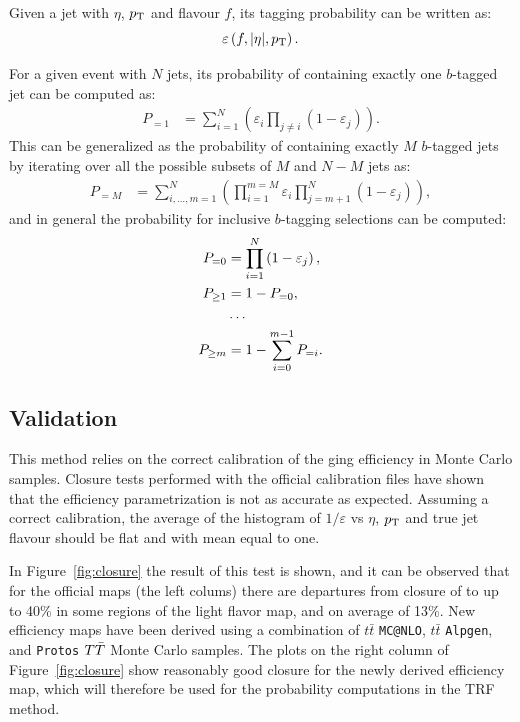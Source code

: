 Given a jet with $\eta$, $\pt$ and flavour $f$, its 
tagging probability can be written as:
\begin{equation}
	\varepsilon \left(f,|\eta|,\pt\right).
\end{equation}

For a given event with $N$ jets, its probability of 
containing exactly one $b$-tagged jet can be computed as:
\begin{align}
	P_{=1} &= \sum\limits_{i=1}^N \left( \varepsilon_{i} \prod\limits_{j \neq i} \left( 1 - \varepsilon_{j} \right) \right).\end{align}
This can be generalized as the probability of containing exactly $M$
$b$-tagged jets by iterating over all the possible subsets of $M$ and $N-M$
jets as:
\begin{align}
        P_{=M} &= \sum\limits_{i,\dots,m=1}^N 
        \left( 
        \prod\limits_{i=1}^{m=M} \varepsilon_{i}  
        \prod\limits_{j=m+1}^N \left( 1 - \varepsilon_{j} \right) 
        \right),
\end{align}
and in general the probability for inclusive $b$-tagging selections can be
computed:
\begin{align}
	P_{=0} &= \prod\limits_{i=1}^N \left( 1 - \varepsilon_{j} \right), \\
	P_{\geq 1} &= 1 - P_{=0},\\
&\dots \notag\\
	P_{\geq m} &= 1 - \sum\limits_{i=0}^{m-1} P_{=i}.
\end{align}

\subsection{Validation}
This method relies on the correct calibration of the \btag ging efficiency in 
Monte Carlo samples. 
Closure tests performed with the official calibration files have shown that 
the efficiency parametrization is not as accurate as expected.
Assuming a correct calibration, the average of the histogram of 
$1/\varepsilon$ vs $\eta$, $\pt$ and true jet flavour should be 
flat and with mean equal to one.

In Figure~\ref{fig:closure} the result of this test is shown, and it 
can be observed that for the official maps (the left colums) there 
are departures from closure of to up to 40\% in some regions of the light flavor
map, and on average of 13\%.
New efficiency maps have been derived using a combination 
of $t\bar{t}$ \texttt{MC@NLO}, $t\bar{t}$ \texttt{Alpgen}, and 
\texttt{Protos} $\TT$ Monte Carlo samples.
The plots on the right column of Figure~\ref{fig:closure} 
show reasonably good closure for the newly derived efficiency map,
which will therefore be used for the probability computations in the TRF method.

